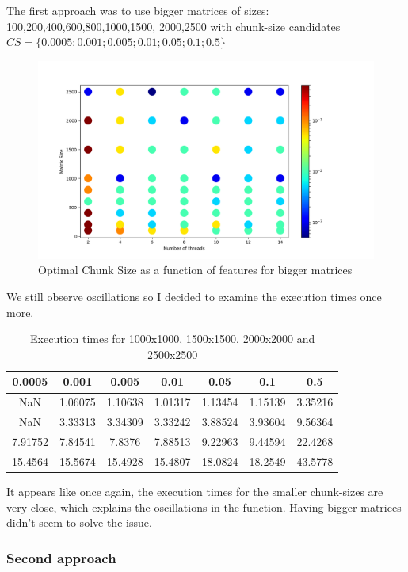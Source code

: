 \documentclass[12pt]{article}
\begin{document}
The first approach was to use bigger matrices of sizes:
100,200,400,600,800,1000,1500,
2000,2500 with chunk-size candidates $CS=\{0.0005;0.001; 0.005; 0.01; 0.05; 0.1;0.5\}$

\begin{figure}[H]
	\centering
	\includegraphics[width=120mm]{function_big.png}
	\caption{Optimal Chunk Size as a function of features for bigger matrices}
\end{figure}

We still observe oscillations so I decided to examine the execution times once more.

\begin{table}[h]
	\centering
	\caption{Execution times for 1000x1000, 1500x1500, 2000x2000 and 2500x2500}
	\label{my-label}
	\begin{tabular}{|c|c|c|c|c|c|c|}
		\hline
		0.0005  & 0.001   & 0.005   & 0.01    & 0.05    & 0.1     & 0.5     \\ \hline
		NaN     & 1.06075 & 1.10638 & 1.01317 & 1.13454 & 1.15139 & 3.35216 \\ \hline
		NaN     & 3.33313 & 3.34309 & 3.33242 & 3.88524 & 3.93604 & 9.56364 \\ \hline
		7.91752 & 7.84541 & 7.8376  & 7.88513 & 9.22963 & 9.44594 & 22.4268 \\ \hline
		15.4564 & 15.5674 & 15.4928 & 15.4807 & 18.0824 & 18.2549 & 43.5778 \\ \hline
	\end{tabular}
\end{table}

It appears like once again, the execution times for the smaller chunk-sizes are very close, which explains the oscillations in the function. Having bigger matrices didn't seem to solve the issue.

\subsubsection{Second approach}
\end{document}
